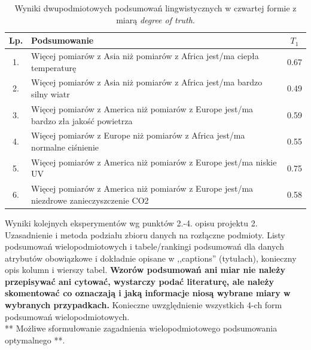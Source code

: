 \documentclass{article}
\begin{document}
\begin{table}[H]
\begin{center}
\normalsize %
\begin{tabular}{|c|p{10cm}|c|} %
\hline
\textbf{Lp.} & \textbf{Podsumowanie} & \textbf{\(T_1\)} \\ \hline
1. & Więcej pomiarów z Asia niż pomiarów z Africa jest/ma ciepła temperaturę & 0.67 \\\hline
2. & Więcej pomiarów z Asia niż pomiarów z Africa jest/ma bardzo silny wiatr & 0.49 \\\hline
3. & Więcej pomiarów z America niż pomiarów z Europe jest/ma bardzo zła jakość powietrza & 0.59 \\\hline
4. & Więcej pomiarów z Europe niż pomiarów z Africa jest/ma normalne ciśnienie & 0.55 \\\hline
5. & Więcej pomiarów z America niż pomiarów z Europe jest/ma niskie UV & 0.75 \\\hline
6. & Więcej pomiarów z America niż pomiarów z Europe jest/ma niezdrowe zanieczyszczenie CO2 & 0.58 \\\hline 
\end{tabular}
\caption{Wyniki dwupodmiotowych podsumowań lingwistycznych w czwartej formie z miarą \textit{degree of truth}.}
\end{center}
\end{table}


Wyniki kolejnych eksperymentów wg punktów 2.-4. opisu projektu 2. Uzasadnienie i
metoda podziału zbioru danych na rozłączne podmioty. Listy podsumowań
wielopodmiotowych i tabele/rankingi podsumowań dla danych atrybutów obowiązkowe i
dokładnie opisane w ,,captions'' (tytułach), konieczny opis kolumn i wierszy tabel.
{\bf Wzorów podsumowań ani miar nie należy przepisywać ani cytować, wystarczy podać literaturę, ale
należy skomentować co oznaczają i jaką informacje niosą wybrane miary w wybranych
przypadkach.} Konieczne uwzględnienie wszystkich 4-ch form podsumowań wielopodmiotowych. 
\\ 

** Możliwe sformułowanie zagadnienia wielopodmiotowego podsumowania optymalnego **.\\
\\

\end{document}
